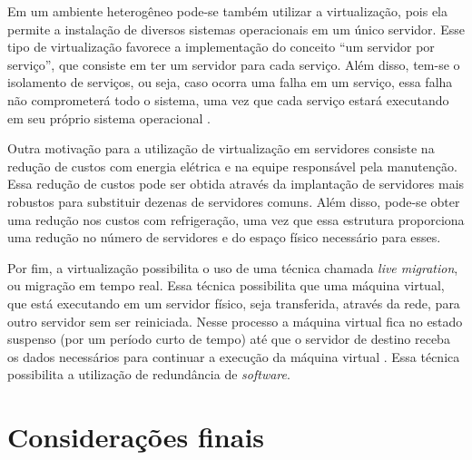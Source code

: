 
Em um ambiente heterogêneo pode-se também utilizar a virtualização, pois ela permite a instalação de diversos sistemas operacionais em um 
único servidor. Esse tipo de virtualização favorece a implementação do conceito ``um servidor por serviço'', que consiste em ter um servidor 
para cada serviço. Além disso, tem-se o isolamento de serviços, ou seja, caso ocorra uma falha em um serviço, essa falha não 
comprometerá todo o sistema, uma vez que cada serviço estará executando em seu próprio sistema operacional \cite{carissimi2008}.

Outra motivação para a utilização de virtualização em servidores consiste na redução de custos com energia elétrica e na equipe responsável pela 
manutenção. Essa redução de custos pode ser obtida através da implantação de servidores mais robustos para substituir dezenas de servidores comuns. 
Além disso, pode-se obter uma redução nos custos com refrigeração, uma vez que essa estrutura proporciona uma redução no número de servidores
e do espaço físico necessário para esses.

Por fim, a virtualização possibilita o uso de uma técnica chamada \textit{live migration}, ou migração em tempo real. Essa técnica possibilita 
que uma máquina virtual, que está executando em um servidor físico, seja transferida, através da rede, para outro servidor sem ser reiniciada. 
Nesse processo a máquina virtual fica no estado suspenso (por um período curto de tempo) até que o servidor de destino receba os dados 
necessários para continuar a execução da máquina virtual \cite{silva2009}. Essa técnica possibilita a utilização de redundância de 
\textit{software}.

\section{Considerações finais}

